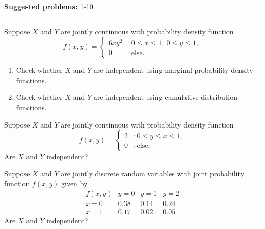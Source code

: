 \documentclass[12pt,reqno]{amsart}
\begin{document}
\textbf{Suggested problems:} 1-10

\bigskip
\hrule

\bigskip
\prob Suppose $X$ and $Y$ are jointly continuous with probability density function
	\[
	f(x,y) = \begin{cases}
	6xy^2 & : 0 \leq x \leq 1 ,\ 0 \leq y \leq 1,\\
	0 & : \text{else}.
	\end{cases}
	\]

\begin{enumerate}
\item Check whether $X$ and $Y$ are independent using marginal probability density functions.\vfill
\item Check whether $X$ and $Y$ are independent using cumulative distribution functions.
\end{enumerate}

\vfill
\prob Suppose $X$ and $Y$ are jointly continuous with probability density function
	\[
	f(x,y) = \begin{cases}
	2 & : 0 \leq y \leq x \leq 1,\\
	0 & : \text{else}.
	\end{cases}
	\]
Are $X$ and $Y$ independent?

\vfill
\newpage
\prob Suppose $X$ and $Y$ are jointly discrete random variables with joint probability function $f(x,y)$ given by
	\[
	\begin{array}{c|lll}
       	f(x,y) & y=0 & y=1 & y=2 \\
	\hline
	x=0 & 0.38 & 0.14 & 0.24 \\
	x=1 & 0.17 & 0.02 & 0.05
	\end{array}
	\]
Are $X$ and $Y$ independent?
\end{document}
